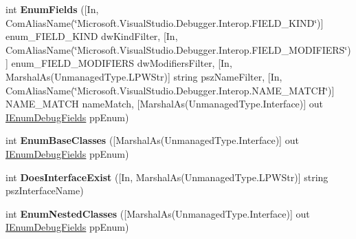 \begin{DoxyCompactItemize}
\item 
\hypertarget{interface_microsoft_1_1_visual_studio_1_1_debugger_1_1_interop_e_e_1_1_i_debug_class_field_ac21ea0a2bba0a9c50492f74bf1738f95}{int {\bfseries Enum\+Fields} (\mbox{[}In, Com\+Alias\+Name(\char`\"{}Microsoft.\+Visual\+Studio.\+Debugger.\+Interop.\+F\+I\+E\+L\+D\+\_\+\+K\+I\+N\+D\char`\"{})\mbox{]} enum\+\_\+\+F\+I\+E\+L\+D\+\_\+\+K\+I\+N\+D dw\+Kind\+Filter, \mbox{[}In, Com\+Alias\+Name(\char`\"{}Microsoft.\+Visual\+Studio.\+Debugger.\+Interop.\+F\+I\+E\+L\+D\+\_\+\+M\+O\+D\+I\+F\+I\+E\+R\+S\char`\"{})\mbox{]} enum\+\_\+\+F\+I\+E\+L\+D\+\_\+\+M\+O\+D\+I\+F\+I\+E\+R\+S dw\+Modifiers\+Filter, \mbox{[}In, Marshal\+As(Unmanaged\+Type.\+L\+P\+W\+Str)\mbox{]} string psz\+Name\+Filter, \mbox{[}In, Com\+Alias\+Name(\char`\"{}Microsoft.\+Visual\+Studio.\+Debugger.\+Interop.\+N\+A\+M\+E\+\_\+\+M\+A\+T\+C\+H\char`\"{})\mbox{]} N\+A\+M\+E\+\_\+\+M\+A\+T\+C\+H name\+Match, \mbox{[}Marshal\+As(Unmanaged\+Type.\+Interface)\mbox{]} out \hyperlink{interface_microsoft_1_1_visual_studio_1_1_debugger_1_1_interop_e_e_1_1_i_enum_debug_fields}{I\+Enum\+Debug\+Fields} pp\+Enum)}\label{interface_microsoft_1_1_visual_studio_1_1_debugger_1_1_interop_e_e_1_1_i_debug_class_field_ac21ea0a2bba0a9c50492f74bf1738f95}

\item 
\hypertarget{interface_microsoft_1_1_visual_studio_1_1_debugger_1_1_interop_e_e_1_1_i_debug_class_field_a870e82474f0722ed9f0f35c53bc16596}{int {\bfseries Enum\+Base\+Classes} (\mbox{[}Marshal\+As(Unmanaged\+Type.\+Interface)\mbox{]} out \hyperlink{interface_microsoft_1_1_visual_studio_1_1_debugger_1_1_interop_e_e_1_1_i_enum_debug_fields}{I\+Enum\+Debug\+Fields} pp\+Enum)}\label{interface_microsoft_1_1_visual_studio_1_1_debugger_1_1_interop_e_e_1_1_i_debug_class_field_a870e82474f0722ed9f0f35c53bc16596}

\item 
\hypertarget{interface_microsoft_1_1_visual_studio_1_1_debugger_1_1_interop_e_e_1_1_i_debug_class_field_a8ccfb507da0b7332de0b763315a44b95}{int {\bfseries Does\+Interface\+Exist} (\mbox{[}In, Marshal\+As(Unmanaged\+Type.\+L\+P\+W\+Str)\mbox{]} string psz\+Interface\+Name)}\label{interface_microsoft_1_1_visual_studio_1_1_debugger_1_1_interop_e_e_1_1_i_debug_class_field_a8ccfb507da0b7332de0b763315a44b95}

\item 
\hypertarget{interface_microsoft_1_1_visual_studio_1_1_debugger_1_1_interop_e_e_1_1_i_debug_class_field_adfa3a9a39febbb14dbfac5b98117faa9}{int {\bfseries Enum\+Nested\+Classes} (\mbox{[}Marshal\+As(Unmanaged\+Type.\+Interface)\mbox{]} out \hyperlink{interface_microsoft_1_1_visual_studio_1_1_debugger_1_1_interop_e_e_1_1_i_enum_debug_fields}{I\+Enum\+Debug\+Fields} pp\+Enum)}\label{interface_microsoft_1_1_visual_studio_1_1_debugger_1_1_interop_e_e_1_1_i_debug_class_field_adfa3a9a39febbb14dbfac5b98117faa9}


\end{DoxyCompactItemize}
